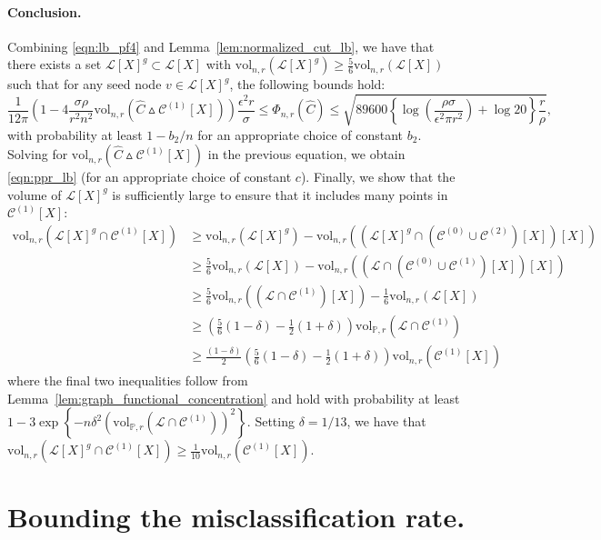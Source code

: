 \documentclass[11pt,twoside]{article}
\theoremstyle{definition}
\newcommand{\set}[1]{\left\{#1\right\}}
\newcommand{\vol}{\mathrm{vol}}
\newcommand{\1}{\mathbbm{1}}
\newcommand{\Xbf}{X}
\newcommand{\Pbb}{\mathbb{P}}
\newcommand{\Cset}{\mathcal{C}}
\newcommand{\Cest}{\widehat{C}}
\begin{document}
\paragraph{Conclusion.}
Combining \eqref{eqn:lb_pf4} and Lemma~\ref{lem:normalized_cut_lb}, we have that there exists a set $\mathcal{L}[\Xbf]^g \subset \mathcal{L}[\Xbf]$ with $\vol_{n,r}(\mathcal{L}[\Xbf]^g) \geq \frac{5}{6}\vol_{n,r}(\mathcal{L}[\Xbf])$ such that for any seed node $v \in \mathcal{L}[\Xbf]^g$, the following bounds hold:
\begin{equation*}
\frac{1}{12\pi} \left(1 - 4\frac{\sigma \rho}{r^2 n^2} \vol_{n,r}(\Cest \vartriangle \Cset^{(1)}[\Xbf]) \right) \frac{\epsilon^2 r}{\sigma} \leq \Phi_{n,r}(\Cest) \leq \sqrt{89600\left\{\log\left(\frac{\rho \sigma}{\epsilon^2 \pi r^2}\right) + \log 20\right\} \frac{r}{\rho}},
\end{equation*}
with probability at least $1 - b_2/n$ for an appropriate choice of constant $b_2$. Solving for $\vol_{n,r}(\Cest \vartriangle \Cset^{(1)}[\Xbf])$ in the previous equation, we obtain \eqref{eqn:ppr_lb} (for an appropriate choice of constant $c$).
Finally, we show that the volume of $\mathcal{L}[\Xbf]^g$ is sufficiently large to ensure that it includes many points in $\Cset^{(1)}[\Xbf]$:
\begin{align*}
\vol_{n,r}(\mathcal{L}[\Xbf]^g \cap \Cset^{(1)}[\Xbf]) & \geq  \vol_{n,r}(\mathcal{L}[\Xbf]^g) - \vol_{n,r}((\mathcal{L}[\Xbf]^g \cap (\Cset^{(0)} \cup \Cset^{(2)})[\Xbf])[\Xbf]) \\
& \geq \frac{5}{6}\vol_{n,r}(\mathcal{L}[\Xbf]) - \vol_{n,r}((\mathcal{L} \cap (\Cset^{(0)} \cup \Cset^{(1)})[\Xbf])[\Xbf]) \\
& \geq \frac{5}{6}\vol_{n,r}((\mathcal{L} \cap \Cset^{(1)})[\Xbf]) - \frac{1}{6}\vol_{n,r}(\mathcal{L}[\Xbf]) \\
& \geq \left(\frac{5}{6}(1 - \delta) - \frac{1}{2}(1 + \delta)\right)\vol_{\Pbb,r}( \mathcal{L} \cap \Cset^{(1)}) \\
& \geq \frac{(1 - \delta)}{2}\left(\frac{5}{6}(1 - \delta) - \frac{1}{2}(1 + \delta)\right)\vol_{n,r}(\Cset^{(1)}[\Xbf])
\end{align*}
where the final two inequalities follow from Lemma~\ref{lem:graph_functional_concentration} and hold with probability at least $1 - 3\exp\set{-n\delta^2(\vol_{\Pbb,r}( \mathcal{L} \cap \Cset^{(1)}))^2}$. Setting $\delta = 1/13$, we have that $\vol_{n,r}(\mathcal{L}[\Xbf]^g \cap \Cset^{(1)}[\Xbf]) \geq \frac{1}{10}\vol_{n,r}(\Cset^{(1)}[\Xbf])$.

\section{Bounding the misclassification rate.}
\label{sec: proof_of_misclassification_rate}
\end{document}
